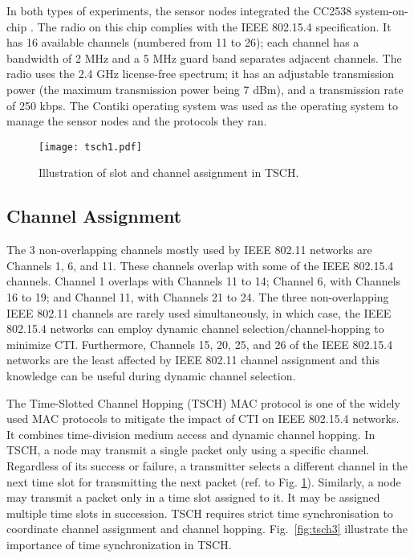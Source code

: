 In both types of experiments, the sensor nodes integrated the CC2538 system-on-chip \cite{cc2538_soc_2013}. The radio on this chip complies  with the IEEE 802.15.4 specification. It has 16 available channels (numbered from 11 to 26); each channel has a bandwidth of 2 MHz and a 5 MHz guard band separates adjacent channels. The radio uses the 2.4 GHz license-free spectrum; it has an adjustable transmission power (the maximum transmission power being 7 dBm), and a transmission rate of 250 kbps. The Contiki operating system \cite{Contiki-NG-2022} was used as the operating system to manage the sensor nodes and the protocols they ran.

\begin{figure}
	\centering
	\texttt{[image: tsch1.pdf]}
	\caption{Illustration of slot and channel assignment in TSCH.}
	\label{fig:tsch}
\end{figure}

\subsection{Channel Assignment}

The 3 non-overlapping channels mostly used by IEEE 802.11 networks are Channels 1, 6, and 11. These channels overlap with some of the IEEE 802.15.4 channels. Channel 1 overlaps with Channels 11 to 14; Channel 6, with Channels 16 to 19; and Channel 11, with Channels 21 to 24. The three non-overlapping IEEE 802.11 channels are rarely used simultaneously, in which case, the IEEE 802.15.4 networks can employ dynamic channel selection/channel-hopping to minimize CTI. Furthermore, Channels 15, 20, 25, and 26 of the IEEE 802.15.4 networks are the least affected by IEEE 802.11 channel assignment and this knowledge can be useful during dynamic channel selection.

The Time-Slotted Channel Hopping (TSCH) MAC protocol \cite{dujovne20146tisch} is one of the widely used MAC protocols to mitigate the impact of CTI on IEEE 802.15.4 networks. It combines time-division medium access and dynamic channel hopping. In TSCH, a node may transmit a single packet only using a specific channel. Regardless of its success or failure, a transmitter selects a different channel in the next time slot for transmitting the next packet (ref. to Fig. \ref{fig:tsch}). Similarly, a node may transmit a packet only in a time slot assigned to it. It may be assigned multiple time slots in succession. TSCH requires strict time synchronisation to coordinate channel assignment and channel hopping. Fig.~\ref{fig:tsch3} illustrate the importance of time synchronization in TSCH.

